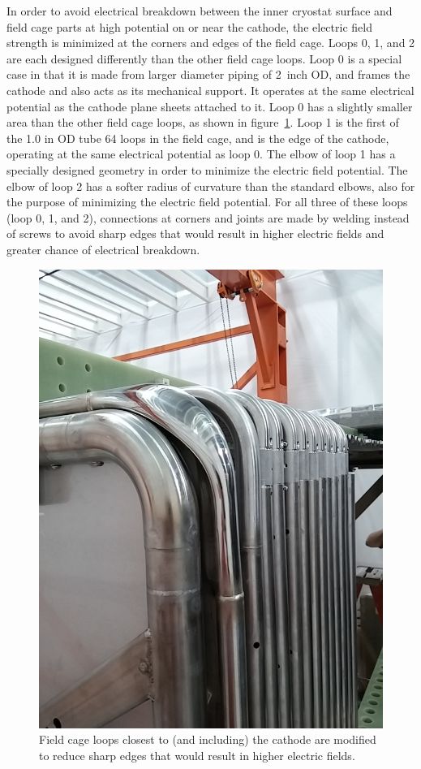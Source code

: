 In order to avoid electrical breakdown between the inner cryostat surface and field cage parts at high potential on or near the cathode, the electric field strength is minimized at the corners and edges of the field cage. Loops 0, 1, and 2 are each designed differently than the other field cage loops.  Loop 0 is a special case in that it is made from larger diameter piping of 2~inch OD, and frames the cathode and also acts as its mechanical support.  It operates at the same electrical potential as the cathode plane sheets attached to it.  Loop 0 has a slightly smaller area than the other field cage loops, as shown in figure~\ref{fig:tpc-smooshed-elbow}.  Loop 1 is the first of the 1.0 in OD tube 64 loops in the field cage, and is the edge of the cathode, operating at the same electrical potential as loop 0.  The elbow of loop 1 has a specially designed geometry in order to minimize the electric field potential.  The elbow of loop 2 has a softer radius of curvature than the standard elbows, also for the purpose of minimizing the electric field potential. For all three of these loops (loop 0, 1, and 2), connections at corners and joints are made by welding instead of screws to avoid sharp edges that would result in higher electric fields and greater chance of electrical breakdown.

\begin{figure}[htb]
\centering	
\includegraphics[width=0.8\linewidth]{figures/tpc-smooshed-elbow-3.jpg}
\caption{Field cage loops closest to (and including) the cathode are modified to reduce sharp edges that would result in higher electric fields.}
\label{fig:tpc-smooshed-elbow}
\end{figure}


